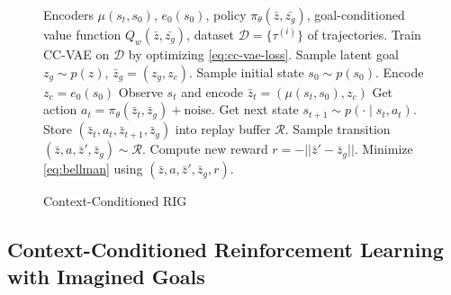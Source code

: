 \begin{figure}
    \begin{algorithm}[H]
       	\footnotesize
       	\caption{Context-Conditioned RIG}
       	\label{alg:tbd}
       	\begin{algorithmic}[1]
        \REQUIRE Encoders $\mu(s_t, s_0)$, $e_0(s_0)$, policy $\pi_\theta(\bar{z}, \bar{z_g})$, goal-conditioned value function $Q_w(\bar{z}, \bar{z_g})$, dataset $\mathcal D = \{\tau^{(i)}\}$ of trajectories.
        \STATE Train CC-VAE on $\mathcal D$ by optimizing \eqref{eq:cc-vae-loss}.
            \STATE Sample latent goal $z_g \sim p(z)$, $\bar{z}_g = (z_g, z_c)$.
            \STATE Sample initial state $s_0 \sim p(s_0)$.
            \STATE Encode $z_c = e_0(s_0)$
                \STATE Observe $s_t$ and encode $\bar{z}_t = (\mu(s_t, s_0), z_c)$
                \STATE Get action $a_t = \pi_\theta(\bar{z}_t, \bar{z}_g) + \text{noise}$.
                \STATE Get next state $s_{t+1} \sim p(\cdot \mid s_t, a_t)$.
                \STATE Store $(\bar{z}_t, a_t, \bar{z}_{t+1}, \bar{z}_g)$ into replay buffer $\mathcal R$.
                \STATE Sample transition $(\bar{z}, a, \bar{z}', \bar{z}_g) \sim \mathcal R$.
                \STATE Compute new reward $r = -||\bar{z}' - \bar{z}_g||$.
                \STATE Minimize \eqref{eq:bellman} using $(\bar{z}, a, \bar{z}', \bar{z}_g, r)$.
            \ENDFOR
        \ENDFOR
       	\end{algorithmic}
    \end{algorithm}
    \vspace{-0.2cm}
\end{figure}

\subsection{Context-Conditioned Reinforcement Learning with Imagined Goals}
\label{sec:ccrig}


